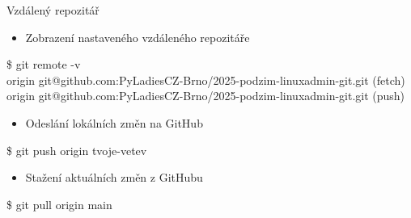 \documentclass{beamer}
\begin{document}
\begin{frame}[fragile]{Vzdálený repozitář}
	
	\begin{itemize}
		\item Zobrazení nastaveného vzdáleného repozitáře
	\end{itemize}
	
	{\ttfamily\small
		\$ git remote -v \\
		origin  git@github.com:PyLadiesCZ-Brno/2025-podzim-linuxadmin-git.git (fetch) \\
		origin  git@github.com:PyLadiesCZ-Brno/2025-podzim-linuxadmin-git.git (push) \\
	}
	
	\hspace{0.5cm}
	\begin{itemize}
		\item Odeslání lokálních změn na GitHub
	\end{itemize}
	
	{\ttfamily\small
		\$ git push origin tvoje-vetev \\

	}
	
	\hspace{0.5cm}
	\begin{itemize}
		\item Stažení aktuálních změn z GitHubu
	\end{itemize}
	
	{\ttfamily\small
		\$ git pull origin main \\

	}
\end{frame}

	
\end{document}
